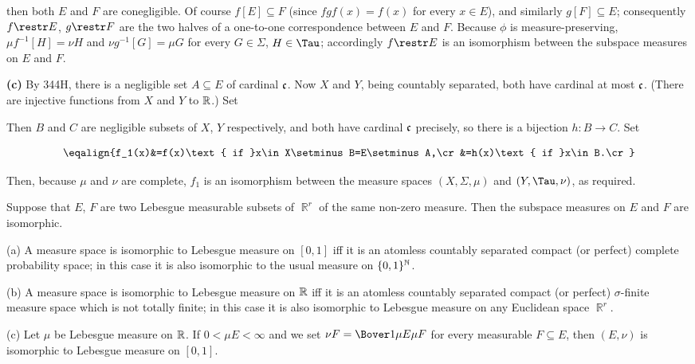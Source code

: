 {

\noindent then both $E$ and $F$ are conegligible.   Of course
$f[E]\subseteq F$ (since $fgf(x)=f(x)$ for every $x\in E$), and
similarly $g[F]\subseteq E$;  consequently $f\restr E$, $g\restr F$ are
the two halves of a one-to-one correspondence between $E$ and $F$.
Because $\phi$ is measure-preserving, $\mu f^{-1}[H]=\nu H$ and
$\nu g^{-1}[G]=\mu G$ for every $G\in\Sigma$, $H\in\Tau$;
accordingly $f\restr E$ is an isomorphism between the subspace measures
on $E$ and $F$.

\medskip

{\bf (c)} By 344H, there is a
negligible set $A\subseteq E$ of cardinal $\frak c$.   Now $X$ and $Y$,
being countably separated, both have cardinal at most $\frak c$.
(There are injective functions from $X$ and $Y$ to $\Bbb R$.)   Set


\noindent Then $B$ and $C$ are negligible subsets of $X$, $Y$
respectively, and both have cardinal $\frak c$ precisely, so there is a
bijection $h:B\to C$.   Set

$$\eqalign{f_1(x)&=f(x)\text{ if }x\in X\setminus B=E\setminus A,\cr
&=h(x)\text{ if }x\in B.\cr}$$

\noindent Then, because $\mu$ and $\nu$ are complete, $f_1$ is an
isomorphism between the measure spaces
$(X,\Sigma,\mu)$ and $(Y,\Tau,\nu)$, as required.
}%

 Suppose that $E$, $F$ are two Lebesgue
measurable subsets of $\BbbR^r$ of the same non-zero measure.   Then
the subspace measures on $E$ and $F$ are isomorphic.

 (a) A measure space is isomorphic to Lebesgue
measure on $[0,1]$ iff it is an atomless countably separated compact (or
perfect) complete probability space;  in this case it is also isomorphic
to the usual measure on $\{0,1\}^{\Bbb N}$.

(b) A measure space is isomorphic to Lebesgue measure on $\Bbb R$ iff it
is an atomless countably separated compact (or perfect) $\sigma$-finite
measure space which is not totally finite;  in this case it is also
isomorphic to Lebesgue measure on any Euclidean space $\BbbR^r$.

(c) Let $\mu$ be Lebesgue measure on $\Bbb R$.   If $0<\mu E<\infty$ and
we set $\nu F=\Bover1{\mu E}\mu F$ for every measurable $F\subseteq E$,
then $(E,\nu)$ is isomorphic to Lebesgue measure on $[0,1]$.

